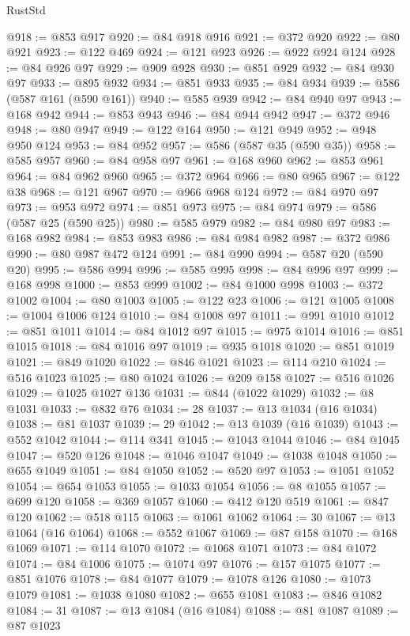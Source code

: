\begin{lexlean}{RustStd}
\begin{coremodule}
{\begin{coremodule}
{{{{{{{{{{{{{{{{{{{{{{{{{{{{{{{{{{{{{{{{{{{{{{{{{{{{{@918 := @853 @917
@920 := @84 @918 @916
@921 := @372 @920
@922 := @80 @921
@923 := @122 @469
@924 := @121 @923
@926 := @922 @924 @124
@928 := @84 @926 @97
@929 := @909 @928
@930 := @851 @929
@932 := @84 @930 @97
@933 := @895 @932
@934 := @851 @933
@935 := @84 @934
@939 := @586 (@587 @161 (@590 @161))
@940 := @585 @939
@942 := @84 @940 @97
@943 := @168 @942
@944 := @853 @943
@946 := @84 @944 @942
@947 := @372 @946
@948 := @80 @947
@949 := @122 @164
@950 := @121 @949
@952 := @948 @950 @124
@953 := @84 @952
@957 := @586 (@587 @35 (@590 @35))
@958 := @585 @957
@960 := @84 @958 @97
@961 := @168 @960
@962 := @853 @961
@964 := @84 @962 @960
@965 := @372 @964
@966 := @80 @965
@967 := @122 @38
@968 := @121 @967
@970 := @966 @968 @124
@972 := @84 @970 @97
@973 := @953 @972
@974 := @851 @973
@975 := @84 @974
@979 := @586 (@587 @25 (@590 @25))
@980 := @585 @979
@982 := @84 @980 @97
@983 := @168 @982
@984 := @853 @983
@986 := @84 @984 @982
@987 := @372 @986
@990 := @80 @987 @472 @124
@991 := @84 @990
@994 := @587 @20 (@590 @20)
@995 := @586 @994
@996 := @585 @995
@998 := @84 @996 @97
@999 := @168 @998
@1000 := @853 @999
@1002 := @84 @1000 @998
@1003 := @372 @1002
@1004 := @80 @1003
@1005 := @122 @23
@1006 := @121 @1005
@1008 := @1004 @1006 @124
@1010 := @84 @1008 @97
@1011 := @991 @1010
@1012 := @851 @1011
@1014 := @84 @1012 @97
@1015 := @975 @1014
@1016 := @851 @1015
@1018 := @84 @1016 @97
@1019 := @935 @1018
@1020 := @851 @1019
@1021 := @849 @1020
@1022 := @846 @1021
@1023 := @114 @210
@1024 := @516 @1023
@1025 := @80 @1024
@1026 := @209 @158
@1027 := @516 @1026
@1029 := @1025 @1027 @136
@1031 := @844 (@1022 @1029)
@1032 := @8 @1031
@1033 := @832 @76
@1034 := 28
@1037 := @13 @1034 (@16 @1034)
@1038 := @81 @1037
@1039 := 29
@1042 := @13 @1039 (@16 @1039)
@1043 := @552 @1042
@1044 := @114 @341
@1045 := @1043 @1044
@1046 := @84 @1045
@1047 := @520 @126
@1048 := @1046 @1047
@1049 := @1038 @1048
@1050 := @655 @1049
@1051 := @84 @1050
@1052 := @520 @97
@1053 := @1051 @1052
@1054 := @654 @1053
@1055 := @1033 @1054
@1056 := @8 @1055
@1057 := @699 @120
@1058 := @369 @1057
@1060 := @412 @120 @519
@1061 := @847 @120
@1062 := @518 @115
@1063 := @1061 @1062
@1064 := 30
@1067 := @13 @1064 (@16 @1064)
@1068 := @552 @1067
@1069 := @87 @158
@1070 := @168 @1069
@1071 := @114 @1070
@1072 := @1068 @1071
@1073 := @84 @1072
@1074 := @84 @1006
@1075 := @1074 @97
@1076 := @157 @1075
@1077 := @851 @1076
@1078 := @84 @1077
@1079 := @1078 @126
@1080 := @1073 @1079
@1081 := @1038 @1080
@1082 := @655 @1081
@1083 := @846 @1082
@1084 := 31
@1087 := @13 @1084 (@16 @1084)
@1088 := @81 @1087
@1089 := @87 @1023
}}}}}}}}}}}}}}}}}}}}}}}}}}}}}}}}}}}}}}}}}}}}}}}}}}}}}
\end{coremodule}}
\end{coremodule}
\end{lexlean}
